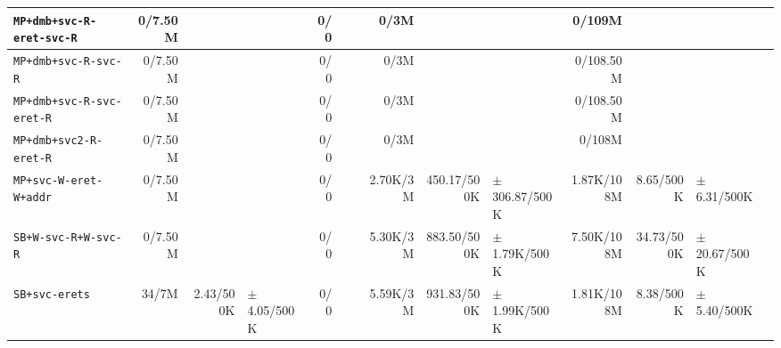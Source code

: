 \begin{tabular}{l  | r r l | r r l | r r l | r r l l}
   \verb|MP+dmb+svc-R-eret-svc-R| &        0/7.50M &                       &                 &            0/0 &                       &  &           0/3M &                       &                   &         0/109M &                       &                  & \\ \hline 
        \verb|MP+dmb+svc-R-svc-R| &        0/7.50M &                       &                 &            0/0 &                       &  &           0/3M &                       &                   &      0/108.50M &                       &                  & \\ \hline 
   \verb|MP+dmb+svc-R-svc-eret-R| &        0/7.50M &                       &                 &            0/0 &                       &  &           0/3M &                       &                   &      0/108.50M &                       &                  & \\ \hline 
      \verb|MP+dmb+svc2-R-eret-R| &        0/7.50M &                       &                 &            0/0 &                       &  &           0/3M &                       &                   &         0/108M &                       &                  & \\ \hline 
      \verb|MP+svc-W-eret-W+addr| &        0/7.50M &                       &                 &            0/0 &                       &  &       2.70K/3M &           450.17/500K & $\pm$ 306.87/500K &     1.87K/108M &             8.65/500K &  $\pm$ 6.31/500K & \\ \hline 
        \verb|SB+W-svc-R+W-svc-R| &        0/7.50M &                       &                 &            0/0 &                       &  &       5.30K/3M &           883.50/500K &  $\pm$ 1.79K/500K &     7.50K/108M &            34.73/500K & $\pm$ 20.67/500K & \\ \hline 
              \verb|SB+svc-erets| &          34/7M &             2.43/500K & $\pm$ 4.05/500K &            0/0 &                       &  &       5.59K/3M &           931.83/500K &  $\pm$ 1.99K/500K &     1.81K/108M &             8.38/500K &  $\pm$ 5.40/500K & \\ \hline 
\end{tabular}
